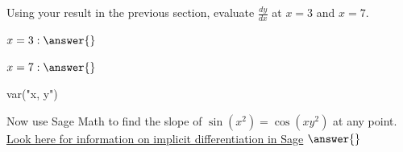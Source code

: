 \documentclass{ximera}
\begin{document}
\begin{question}
Using your result in the previous section, evaluate $\frac{dy}{dx}$ at $x = 3$ and $x = 7$.

$x = 3: \answer{}$

$x = 7: \answer{}$
\end{question}
\begin{question}
\begin{onlineOnly}
\begin{sageCell}
var("x, y")

\end{sageCell}
\end{onlineOnly}

Now use Sage Math to find the slope of  $\sin(x^2)=\cos(xy^2)$ at any point. \href{http://doc.sagemath.org/html/en/tutorial/tour_algebra.html#differentiation-integration-etc}{Look here for information on implicit differentiation in Sage}
$\answer{}$
\end{question}
\end{document}
